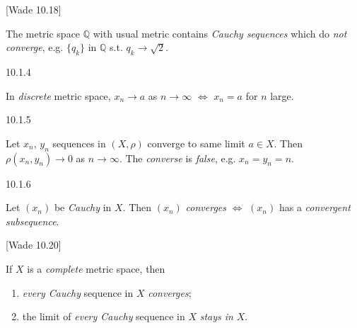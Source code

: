 \documentclass[10pt]{article} %
\newcommand{\cw}[1]{[Wade #1]}
\begin{document}
\begin{multicols}{3}
\begin{remark}{\cw{10.18}}{}

    The metric space $\mathbb{Q}$ with usual metric contains \emph{Cauchy sequences} which do \emph{not converge}, e.g. $\{q_k\}$ in $\mathbb{Q}$ s.t. $q_k \to \sqrt{2}$.

\end{remark}

\begin{exercise}{10.1.4}{}

    In \emph{discrete} metric space, $x_n \to a$ as $n \to \infty$ $\Leftrightarrow$ $x_n = a$ for $n$ large.

\end{exercise}

\begin{exercise}{10.1.5}{}

    Let $x_n$, $y_n$ sequences in $(X,\rho)$ converge to same limit $a \in X$. Then $\rho(x_n,y_n) \to 0$ as $n \to \infty$. The \emph{converse} is \emph{false}, e.g. $x_n = y_n = n$.

\end{exercise}

\begin{exercise}{10.1.6}{}

    Let $(x_n)$ be \emph{Cauchy} in $X$. Then $(x_n)$ \emph{converges} $\Leftrightarrow$ $(x_n)$ has a \emph{convergent subsequence}.

\end{exercise}

\begin{remark}{\cw{10.20}}{}

    If $X$ is a \emph{complete} metric space, then

        \begin{enumerate}[1)]
            \setlength{\parskip}{0em}
            \item \emph{every Cauchy} sequence in $X$ \emph{converges};
            \item the limit of \emph{every Cauchy} sequence in $X$ \emph{stays in} $X$.
        \end{enumerate}

\end{remark}


\end{multicols}
\end{document}
